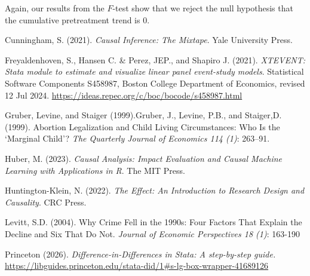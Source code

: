 \documentclass[
]{book}
\begin{document}
Again, our results from the \(F\)-test show that we reject the null hypothesis that the cumulative pretreatment trend is 0.

Cunningham, S. (2021). \emph{Causal Inference: The Mixtape}. Yale University Press.

Freyaldenhoven, S., Hansen C. \& Perez, JEP., and Shapiro J. (2021). \emph{XTEVENT: Stata module to estimate and visualize linear panel event-study models}. Statistical Software Components S458987, Boston College Department of Economics, revised 12 Jul 2024. \url{https://ideas.repec.org/c/boc/bocode/s458987.html}

Gruber, Levine, and Staiger (1999).Gruber, J., Levine, P.B., and Staiger,D. (1999). Abortion Legalization and Child Living Circumstances: Who Is the `Marginal Child'? \emph{The Quarterly Journal of Economics 114 (1)}: 263--91.

Huber, M. (2023). \emph{Causal Analysis: Impact Evaluation and Causal Machine Learning with Applications in R}. The MIT Press.

Huntington-Klein, N. (2022). \emph{The Effect: An Introduction to Research Design and Causality}. CRC Press.

Levitt, S.D. (2004). Why Crime Fell in the 1990s: Four Factors That Explain the Decline and Six That Do Not. \emph{Journal of Economic Perspectives 18 (1)}: 163-190

Princeton (2026). \emph{Difference-in-Differences in Stata: A step-by-step guide.} \url{https://libguides.princeton.edu/stata-did/1\#s-lg-box-wrapper-41689126}


\end{document}

